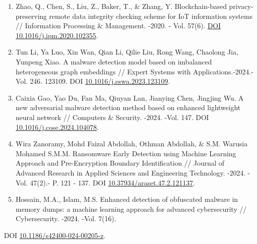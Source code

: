 \begin{references}
\begin{enumerate}
\def\labelenumi{\arabic{enumi}.}
\setcounter{enumi}{3}
\item
  Zhao, Q., Chen, S., Liu, Z., Baker, T., \& Zhang, Y. Blockchain-based
  privacy-preserving remote data integrity checking scheme for IoT
  information systems // Information Processing \& Management. -2020. -
  Vol. 57(6). \href{https://doi.org/10.1016/j.ipm.2020.102355}{DOI
  10.1016/j.ipm.2020.102355}.
\item
  Tun Li, Ya Luo, Xin Wan, Qian Li, Qilie Liu, Rong Wang, Chaolong Jia,
  Yunpeng Xiao. A malware detection model based on imbalanced
  heterogeneous graph embeddings // Expert Systems with
  Applications.-2024.-Vol. 246. 123109. DOI
  \href{https://doi.org/10.1016/j.eswa.2023.123109}{10.1016/j.eswa.2023.123109}.
\item
  Caixia Gao, Yao Du, Fan Ma, Qiuyan Lan, Jianying Chen, Jingjing Wu. A
  new adversarial malware detection method based on enhanced lightweight
  neural network // Computers \& Security. -2024. -Vol. 147. DOI
  \href{https://doi.org/10.1016/j.cose.2024.104078}{10.1016/j.cose.2024.104078}.
\item
  Wira Zanoramy, Mohd Faizal Abdollah, Othman Abdollah, \& S.M. Warusia
  Mohamed S.M.M. Ransomware Early Detection using Machine Learning
  Approach and Pre-Encryption Boundary Identification // Journal of
  Advanced Research in Applied Sciences and Engineering Technology.
  -2024. -Vol. 47(2).- P. 121 - 137. DOI
  \href{https://doi.org/10.37934/araset.47.2.121137}{10.37934/araset.47.2.121137}.
\item
  Hossain, M.A., Islam, M.S. Enhanced detection of obfuscated malware in
  memory dumps: a machine learning approach for advanced cybersecurity
  // Cybersecurity. -2024. -Vol. 7(16).
\end{enumerate}

DOI
\href{https://doi.org/10.1186/s42400-024-00205-z}{10.1186/s42400-024-00205-z}.


\end{references}
